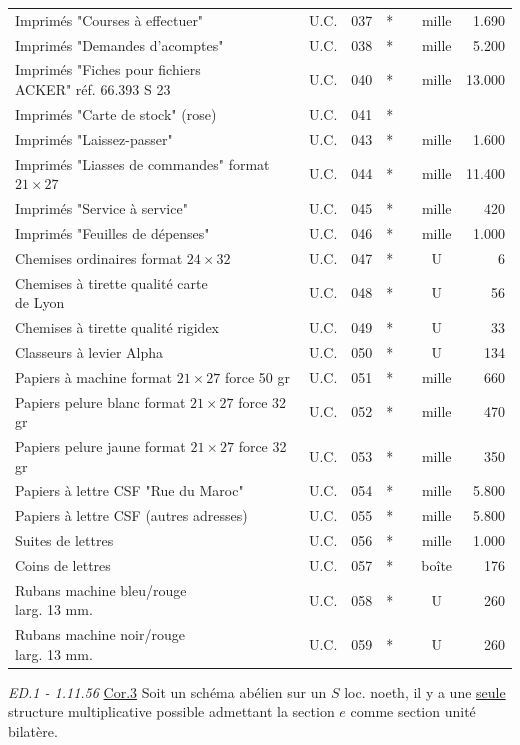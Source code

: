 {{\begin{tabular}{|l|c|r|c|c|c|r|}
Imprimés "Courses à effectuer" & U.C. & 037 & * &  & mille & 1.690 \\
Imprimés "Demandes d'acomptes" & U.C. & 038 & * &  & mille & 5.200 \\
\shortstack[l]{Imprimés "Fiches pour fichiers\\ACKER" réf. 66.393 S 23} & U.C. & 040 & * &  & mille & 13.000 \\
Imprimés "Carte de stock" (rose) & U.C. & 041 & * &  &  &  \\
Imprimés "Laissez-passer" & U.C. & 043 & * &  & mille & 1.600 \\
\shortstack[l]{Imprimés "Liasses de commandes"\\format $21\times27$} & U.C. & 044 & * &  & mille & 11.400 \\
Imprimés "Service à service" & U.C. & 045 & * &  & mille & 420 \\
Imprimés "Feuilles de dépenses" & U.C. & 046 & * &  & mille & 1.000 \\
Chemises ordinaires format $24\times32$ & U.C. & 047 & * &  & U & 6 \\
\shortstack[l]{Chemises à tirette qualité carte\\de Lyon} & U.C. & 048 & * &  & U & 56 \\
Chemises à tirette qualité rigidex & U.C. & 049 & * &  & U & 33 \\
Classeurs à levier Alpha & U.C. & 050 & * &  & U & 134 \\
\shortstack[l]{Papiers à machine format $21\times27$\\force 50 gr} & U.C. & 051 & * &  & mille & 660 \\
\shortstack[l]{Papiers pelure blanc format $21\times27$\\force 32 gr} & U.C. & 052 & * &  & mille & 470 \\
\shortstack[l]{Papiers pelure jaune format $21\times27$\\force 32 gr} & U.C. & 053 & * &  & mille & 350 \\
Papiers à lettre CSF "Rue du Maroc" & U.C. & 054 & * &  & mille & 5.800 \\
Papiers à lettre CSF (autres adresses) & U.C. & 055 & * &  & mille & 5.800 \\
Suites de lettres & U.C. & 056 & * &  & mille & 1.000 \\
Coins de lettres & U.C. & 057 & * &  & boîte & 176 \\
\shortstack[l]{Rubans machine bleu/rouge\\larg. 13 mm.} & U.C. & 058 & * &  & U & 260 \\
\shortstack[l]{Rubans machine noir/rouge\\larg. 13 mm.} & U.C. & 059 & * &  & U & 260 \\
\end{tabular}}}
\hfill\textit{ED.1 - 1.11.56}
\uline{Cor.3} Soit un schéma abélien sur un $S$ loc. noeth, il y a une \uline{seule} structure multiplicative possible admettant la section $e$ comme section unité bilatère.


